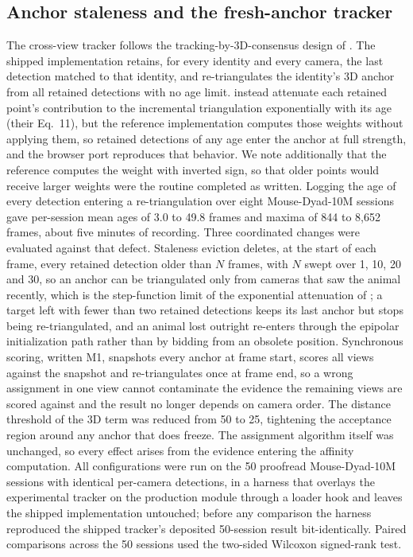 \documentclass[pdflatex, sn-nature]{sn-jnl}
\theoremstyle{thmstyleone}%
\theoremstyle{thmstyletwo}%
\theoremstyle{thmstylethree}%
\begin{document}
\subsection{Anchor staleness and the fresh-anchor tracker}\label{methods-anchor}

The cross-view tracker follows the tracking-by-3D-consensus design of \citet{Chen2020}. The shipped implementation retains, for every identity and every camera, the last detection matched to that identity, and re-triangulates the identity's 3D anchor from all retained detections with no age limit. \citet{Chen2020} instead attenuate each retained point's contribution to the incremental triangulation exponentially with its age (their Eq.~11), but the reference implementation computes those weights without applying them, so retained detections of any age enter the anchor at full strength, and the browser port reproduces that behavior. We note additionally that the reference computes the weight with inverted sign, so that older points would receive larger weights were the routine completed as written. Logging the age of every detection entering a re-triangulation over eight Mouse-Dyad-10M sessions gave per-session mean ages of 3.0 to 49.8 frames and maxima of 844 to 8,652 frames, about five minutes of recording. Three coordinated changes were evaluated against that defect. Staleness eviction deletes, at the start of each frame, every retained detection older than $N$ frames, with $N$ swept over 1, 10, 20 and 30, so an anchor can be triangulated only from cameras that saw the animal recently, which is the step-function limit of the exponential attenuation of \citet{Chen2020}; a target left with fewer than two retained detections keeps its last anchor but stops being re-triangulated, and an animal lost outright re-enters through the epipolar initialization path rather than by bidding from an obsolete position. Synchronous scoring, written M1, snapshots every anchor at frame start, scores all views against the snapshot and re-triangulates once at frame end, so a wrong assignment in one view cannot contaminate the evidence the remaining views are scored against and the result no longer depends on camera order. The distance threshold of the 3D term was reduced from 50 to 25, tightening the acceptance region around any anchor that does freeze. The assignment algorithm itself was unchanged, so every effect arises from the evidence entering the affinity computation. All configurations were run on the 50 proofread Mouse-Dyad-10M sessions with identical per-camera detections, in a harness that overlays the experimental tracker on the production module through a loader hook and leaves the shipped implementation untouched; before any comparison the harness reproduced the shipped tracker's deposited 50-session result bit-identically. Paired comparisons across the 50 sessions used the two-sided Wilcoxon signed-rank test.
\end{document}
